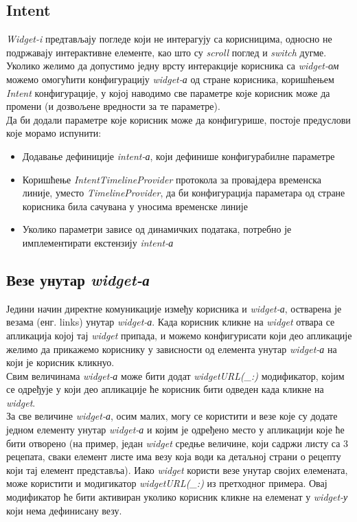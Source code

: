 \documentclass[12pt,oneside]{memoir}
\begin{document}
\subsection{Intent}
\label{subsec:Intent}
\indent \textit{Widget-i} предтављају погледе који не интерагују са корисницима, односно не подржавају интерактивне елементе, као што су \textit{scroll} поглед и \textit{switch} дугме. Уколико желимо да допустимо једну врсту интеракције корисника са \textit{widget-ом} можемо омогућити конфигурацију \textit{widget-а} од стране корисника, коришћењем \textit{Intent} конфигурације, у којој наводимо све параметре које корисник може да промени (и дозвољене вредности за те параметре). 
\\
\indent Да би додали параметре које корисник може да конфигурише, постоје предуслови које морамо испунити:
\begin{itemize}
    \item Додавање дефиниције \textit{intent-а}, који дефинише конфигурабилне параметре 
    \item Коришћење \textit{IntentTimelineProvider} протокола за провајдера временска линије, уместо \textit{TimelineProvider}, да би конфигурација параметара од стране корисника била сачувана у уносима временске линије
    \item Уколико параметри зависе од динамичких података, потребно је имплементирати екстензију \textit{intent-а}
\end{itemize}

\subsection{Везе унутар \textit{widget-а}}
\indent Једини начин директне комуникације између корисника и \textit{widget-а}, остварена је везама (енг. links) унутар \textit{widget-а}. Када корисник кликне на \textit{widget} отвара се апликација којој тај \textit{widget} припада, и можемо конфигурисати који део апликације желимо да прикажемо кориснику у зависности од елемента унутар \textit{widget-а} на који је корисник кликнуо. 
\\ 
\indent Свим величинама \textit{widget-а} може бити додат \textit{widgetURL(\_:)} модификатор, којим се одређује у који део апликације ће корисник бити одведен када кликне на \textit{widget}.
\\
\indent За све величине \textit{widget-а}, осим малих, могу се користити и везе које су додате једном елементу унутар \textit{widget-а} и којим је одређено место у апликацији које ће бити отворено (на пример, један \textit{widget} средње величине, који садржи листу са 3 рецепата, сваки елемент листе има везу која води ка детаљној страни о рецепту који тај елемент представља). Иако \textit{widget} користи везе унутар својих елемената, може користити и модигикатор \textit{widgetURL(\_:)} из претходног примера. Овај модификатор ће бити активиран уколико корисник кликне на елеменат у \textit{widget-у} који нема дефинисану везу. 
\end{document}
